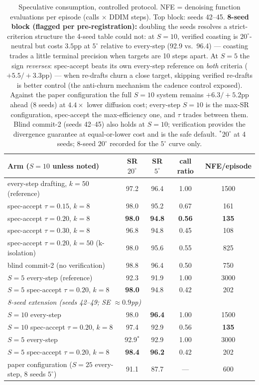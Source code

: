 \documentclass[11pt]{article}
\newcommand{\ours}[1]{\textbf{#1}}
\newcommand{\degc}[1]{$#1^\circ$}
\begin{document}
\begin{table}[h]
\centering
\begin{tabular}{lcccc}
\toprule
Arm ($S{=}10$ unless noted) & SR \degc{20} & SR \degc{5} & call ratio & NFE/episode \\
\midrule
every-step drafting, $k{=}50$ (reference) & 97.2 & 96.4 & 1.00 & 1500 \\
spec-accept $\tau{=}0.15$, $k{=}8$ & 98.0 & 95.2 & 0.67 & 161 \\
spec-accept $\tau{=}0.20$, $k{=}8$ & \ours{98.0} & \ours{94.8} & \ours{0.56} & \ours{135} \\
spec-accept $\tau{=}0.30$, $k{=}8$ & 96.8 & 94.8 & 0.45 & 108 \\
spec-accept $\tau{=}0.20$, $k{=}50$ (k-isolation) & 98.0 & 95.6 & 0.55 & 825 \\
blind commit-2 (no verification) & 98.8 & 96.4 & 0.50 & 750 \\
\midrule
$S{=}5$ every-step (reference) & 92.3 & 91.9 & 1.00 & 3000 \\
$S{=}5$ spec-accept $\tau{=}0.20$, $k{=}8$ & \ours{98.0} & 94.8 & 0.42 & 202 \\
\midrule
\multicolumn{5}{l}{\emph{8-seed extension (seeds 42--49; SE $\approx 0.9$pp)}} \\
$S{=}10$ every-step & 98.0 & \ours{96.4} & 1.00 & 1500 \\
$S{=}10$ spec-accept $\tau{=}0.20$, $k{=}8$ & 97.4 & 92.9 & 0.56 & \ours{135} \\
$S{=}5$ every-step & 92.9$^{*}$ & 92.9 & 1.00 & 3000 \\
$S{=}5$ spec-accept $\tau{=}0.20$, $k{=}8$ & \ours{98.4} & \ours{96.2} & 0.42 & 202 \\
\midrule
paper configuration ($S{=}25$ every-step, 8 seeds \degc{5}) & 91.1 & 87.7 & --- & 600 \\
\bottomrule
\end{tabular}
\caption{Speculative consumption, controlled protocol. NFE = denoising
function evaluations per episode (calls $\times$ DDIM steps). Top block: seeds
42--45. \textbf{8-seed block (flagged per pre-registration):} doubling the seeds
resolves a strict-criterion structure the 4-seed table could not: at $S{=}10$,
verified coasting is \degc{20}-neutral but costs $3.5$pp at \degc{5} relative to
every-step (92.9 vs.\ 96.4) --- coasting trades a little terminal precision when
targets are 10 steps apart. At $S{=}5$ the sign \emph{reverses}: spec-accept beats
its own every-step reference on \emph{both} criteria ($+5.5/+3.3$pp) --- when
re-drafts churn a close target, skipping verified re-drafts is better control (the
anti-churn mechanism the cadence control exposed). Against the paper configuration
the full $S{=}10$ system remains $+6.3/+5.2$pp ahead (8 seeds) at $4.4\times$ lower
diffusion cost; every-step $S{=}10$ is the max-SR configuration, spec-accept the
max-efficiency one, and $\tau$ trades between them. Blind commit-2 (seeds 42--45)
also holds at $S{=}10$; verification provides the divergence guarantee at
equal-or-lower cost and is the safe default. $^{*}$\degc{20} at 4 seeds; 8-seed
\degc{20} recorded for the \degc{5} curve only.}
\end{table}
\end{document}
